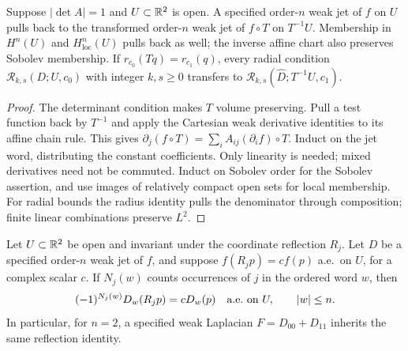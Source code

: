 \begin{lemma}
\label{lem:affine-jet-pullback}
\leanok
Suppose $|\det A|=1$ and $U\subset\mathbb{R}^2$ is open.
A specified order-$n$ weak jet of $f$ on $U$ pulls back to the
transformed order-$n$ weak jet of $f\circ T$ on $T^{-1}U$.
Membership in $H^n(U)$ and $H^n_{\mathrm{loc}}(U)$ pulls back as well;
the inverse affine chart also preserves Sobolev membership.
If $r_{c_0}(Tq)=r_{c_1}(q)$, every radial condition
$\mathcal R_{k,s}(D;U,c_0)$ with integer $k,s\ge0$ transfers to
$\mathcal R_{k,s}(\widehat D;T^{-1}U,c_1)$.
\end{lemma}

\begin{proof}
\leanok
The determinant condition makes $T$ volume preserving.
Pull a test function back by $T^{-1}$ and apply the Cartesian weak
derivative identities to its affine chain rule. This gives
$\partial_j(f\circ T)=\sum_i A_{ij}(\partial_i f)\circ T$.
Induct on the jet word, distributing the constant coefficients.
Only linearity is needed; mixed derivatives need not be commuted.
Induct on Sobolev order for the Sobolev assertion, and use images
of relatively compact open sets for local membership.
For radial bounds the radius identity pulls the denominator through
composition; finite linear combinations preserve $L^2$.
\end{proof}

\begin{lemma}
\label{lem:axis-reflection-weak-jet}
\leanok
Let $U\subset\mathbb{R}^2$ be open and invariant under the coordinate reflection $R_j$.
Let $D$ be a specified order-$n$ weak jet of $f$, and suppose
$f(R_jp)=c f(p)$ a.e.\ on $U$, for a complex scalar $c$.
If $N_j(w)$ counts occurrences of $j$ in the ordered word $w$, then
\[
 (-1)^{N_j(w)}D_w(R_jp)=cD_w(p)
 \quad\hbox{a.e.\ on }U,\qquad |w|\le n.
\]
In particular, for $n=2$, a specified weak Laplacian $F=D_{00}+D_{11}$
inherits the same reflection identity.
\end{lemma}

